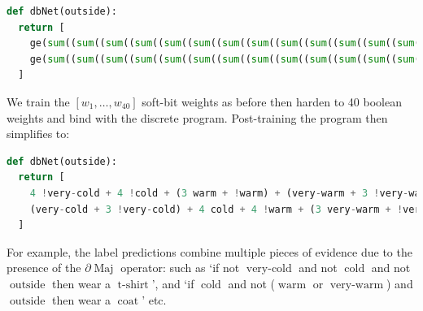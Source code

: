 \documentclass{article} %
\begin{document}
\begin{lstlisting}[language=Python,style=mystyle,frame=single]
def dbNet(outside):
  return [
    ge(sum((sum((sum((sum((sum((sum((sum((sum((sum((sum((sum((sum((sum((sum((sum((sum((sum((sum((sum((sum((0, not(xor(ne(very-cold, 0), w1)))), not(xor(ne(cold, 0), w2)))), not(xor(ne(warm, 0), w3)))), not(xor(ne(very-warm, 0), w4)))), not(xor(ne(outside, 0), w5)))), not(xor(ne(very-cold, 0), w6)))), not(xor(ne(cold, 0), w7)))), not(xor(ne(warm, 0), w8)))), not(xor(ne(very-warm, 0), w9)))), not(xor(ne(outside, 0), w10)))), not(xor(ne(very-cold, 0), w11)))), not(xor(ne(cold, 0), w12)))), not(xor(ne(warm, 0), w13)))), not(xor(ne(very-warm, 0), w14)))), not(xor(ne(outside, 0), w15)))), not(xor(ne(very-cold, 0), w16)))), not(xor(ne(cold, 0), w17)))), not(xor(ne(warm, 0), w18)))), not(xor(ne(very-warm, 0), w19)))), not(xor(ne(outside, 0), w20)))), 11),
    ge(sum((sum((sum((sum((sum((sum((sum((sum((sum((sum((sum((sum((sum((sum((sum((sum((sum((sum((sum((sum((0, not(xor(ne(very-cold, 0), w21)))), not(xor(ne(cold, 0), w22)))), not(xor(ne(warm, 0), w23)))), not(xor(ne(very-warm, 0), w24)))), not(xor(ne(outside, 0), w25)))), not(xor(ne(very-cold, 0), w26)))), not(xor(ne(cold, 0), w27)))), not(xor(ne(warm, 0), w28)))), not(xor(ne(very-warm, 0), w29)))), not(xor(ne(outside, 0), w30)))), not(xor(ne(very-cold, 0), w31)))), not(xor(ne(cold, 0), w32)))), not(xor(ne(warm, 0), w33)))), not(xor(ne(very-warm, 0), w34)))), not(xor(ne(outside, 0), w35)))), not(xor(ne(very-cold, 0), w36)))), not(xor(ne(cold, 0), w37)))), not(xor(ne(warm, 0), w38)))), not(xor(ne(very-warm, 0), w39)))), not(xor(ne(outside, 0), w40)))), 11)
  ]
\end{lstlisting}
We train the $[w_{1}, \dots, w_{40}]$ soft-bit weights as before then harden to 40 boolean weights and bind with the discrete program. Post-training the program then simplifies to:

\begin{lstlisting}[language=Python,style=mystyle,frame=single]
def dbNet(outside):
  return [
    4 !very-cold + 4 !cold + (3 warm + !warm) + (very-warm + 3 !very-warm) + (outside + 3 !outside) >= 11,
    (very-cold + 3 !very-cold) + 4 cold + 4 !warm + (3 very-warm + !very-warm) + 2 (outside + !outside) >= 11
  ]
\end{lstlisting}

For example, the label predictions combine multiple pieces of evidence due to the presence of the $\partial\!\operatorname{Maj}$ operator: such as `if not $\operatorname{very-cold}$ and not $\operatorname{cold}$ and not $\operatorname{outside}$ then wear a $\operatorname{t-shirt}$', and `if $\operatorname{cold}$ and not ($\operatorname{warm}$ or $\operatorname{very-warm}$) and $\operatorname{outside}$ then wear a $\operatorname{coat}$' etc.
\end{document}
